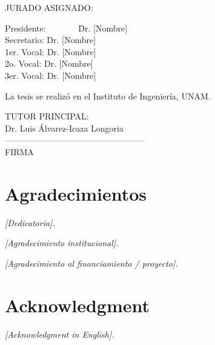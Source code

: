 \documentclass[../../Tesis_JALS_Maestria.tex]{subfiles}
\begin{document}
\thispagestyle{empty}
\vspace{30mm}

\noindent JURADO ASIGNADO:
\vspace{8mm}

\begin{tabbing}
	Presidente: \ \ \ \ \ \ \ \=Dr. [Nombre]  \\ [3mm]
	Secretario: \> Dr. [Nombre] \\ [3mm]
	1er. Vocal: \> Dr. [Nombre] \\ [3mm]
	2o. Vocal: \> Dr. [Nombre] \\ [3mm]
	3er. Vocal: \> Dr. [Nombre] \\ [12mm]
\end{tabbing}

\vspace{1.5cm}
\noindent La tesis se realizó en el Instituto de Ingeniería, UNAM.

\begin{center}
	TUTOR PRINCIPAL:\\ \vspace{0.2cm}
	Dr. Luis Álvarez-Icaza Longoria\\
	\vspace{1cm}
	--------------------------------------------------\\
	FIRMA
\end{center}




\chapter*{Agradecimientos}
\thispagestyle{empty}
\begin{flushright}
	\textit{[Dedicatoria].}\vspace{0.5cm}

	\textit{[Agradecimiento institucional].}\vspace{0.5cm}

	\textit{[Agradecimiento al financiamiento / proyecto].}
\end{flushright}



\chapter*{Acknowledgment}
\thispagestyle{empty}
\begin{flushright}
		\textit{[Acknowledgment in English].}\vspace{0.5cm}

\end{flushright}
\end{document}
